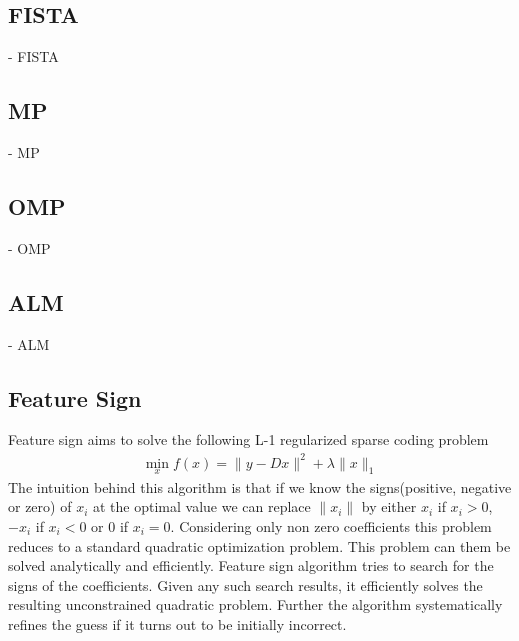 \documentclass{article} %
\begin{document}
\subsection{FISTA}
  -	FISTA
\subsection{MP}
  -	MP
\subsection{OMP}
  -	OMP
\subsection{ALM}
  -	ALM
\subsection{Feature Sign}
Feature sign aims to solve the following L-1 regularized sparse coding problem
\begin{align}
\min_x f(x) = \|y - Dx\|^2 + \lambda\|x\|_1
\end{align}
The intuition behind this algorithm is that if we know the signs(positive, negative or zero) of $x_i$ at the optimal value we can replace $\|x_i\|$ by either $x_i$ if $x_i > 0$, $-x_i$ if $x_i < 0$ or 0 if $x_i = 0$. Considering only non zero coefficients this problem reduces to a standard quadratic optimization problem. This problem can them be solved analytically and efficiently. Feature sign algorithm tries to search for the signs of the coefficients. Given any such search results, it efficiently solves the resulting unconstrained quadratic problem. Further the algorithm systematically refines the guess if it turns out to be initially incorrect.
\end{document}
